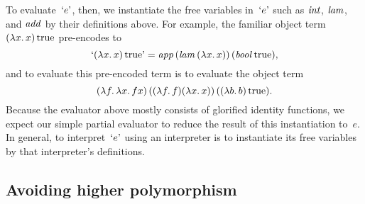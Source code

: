 To evaluate~$\encode{e}$, then, we
instantiate the free variables in~$\encode{e}$ such as $\ident{int}$,
$\ident{lam}$, and $\ident{add}$ by their definitions above.  For
example, the familiar object term $(\fun{x}x)\True$ pre-encodes to
\begin{equation*}
    \encode{(\fun{x}x)\True} = \ident{app}
    (\ident{lam} (\fun{x} x))\, (\ident{bool} \True),
\end{equation*}
and to evaluate this pre-encoded term is to evaluate the object term
\begin{equation*}
    (\fun{f} \fun{x} fx) \,
    ((\fun{f} f) (\fun{x} x))\, ((\fun{b} b) \True).
\end{equation*}
Because the evaluator above mostly consists of glorified identity
functions, we expect our simple partial evaluator to reduce the
result of this instantiation to~$e$.  In general, to
interpret~$\encode{e}$ using an interpreter is to instantiate its free
variables by that interpreter's definitions.

\subsection{Avoiding higher polymorphism}

